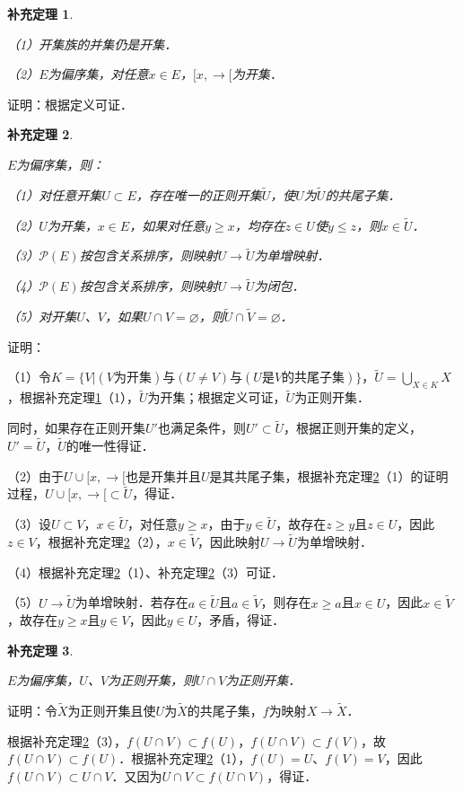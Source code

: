 \documentclass[12pt, a4paper, oneside]{book}
\newtheorem{cor}{补充定理}
\begin{document}
			\begin{cor}\label{cor206}
				\hfill\par
				（1）开集族的并集仍是开集．
				\par
				（2）$E$为偏序集，对任意$x\in E$，$[x, \to [$为开集．
			\end{cor}
			证明：根据定义可证．
			
			\begin{cor}\label{cor207}
				\hfill\par
				$E$为偏序集，则：
				\par
				（1）对任意开集$U\subset E$，存在唯一的正则开集$\tilde{U}$，使$U$为$\tilde{U}$的共尾子集．
				\par
				（2）$U$为开集，$x\in E$，如果对任意$y\geq x$，均存在$z\in U$使$y\leq z$，则$x\in \tilde{U}$．
				\par
				（3）$\mathcal{P}(E)$按包含关系排序，则映射$U\to \tilde{U}$为单增映射．
				\par
				（4）$\mathcal{P}(E)$按包含关系排序，则映射$U\to \tilde{U}$为闭包．
				\par
				（5）对开集$U$、$V$，如果$U\cap V=\varnothing$，则$\tilde{U}\cap \tilde{V}=\varnothing$．
			\end{cor}
			证明：
			\par
			（1）令$K=\{V|(V\text{为开集})\text{与}(U\neq V)\text{与}(U\text{是}V\text{的共尾子集})\}$，$\tilde{U}=\bigcup\limits_{X\in K}X$，根据补充定理\ref{cor206}（1），$\tilde{U}$为开集；根据定义可证，$\tilde{U}$为正则开集．
			\par
			同时，如果存在正则开集$U'$也满足条件，则$U'\subset \tilde{U}$，根据正则开集的定义，$U'=\tilde{U}$，$\tilde{U}$的唯一性得证．
			\par
			（2）由于$U\cup [x, \to [$也是开集并且$U$是其共尾子集，根据补充定理\ref{cor207}（1）的证明过程，$U\cup [x, \to [\subset \tilde{U}$，得证．
			\par
			（3）设$U\subset V$，$x\in \tilde{U}$，对任意$y\geq x$，由于$y\in \tilde{U}$，故存在$z\geq y$且$z\in U$，因此$z\in V$，根据补充定理\ref{cor207}（2），$x\in \tilde{V}$，因此映射$U\to \tilde{U}$为单增映射．
			\par
			（4）根据补充定理\ref{cor207}（1）、补充定理\ref{cor207}（3）可证．
			\par
			（5）$U\to \tilde{U}$为单增映射．若存在$a\in \tilde{U}$且$a\in \tilde{V}$，则存在$x\geq a$且$x\in U$，因此$x\in \tilde{V}$，故存在$y\geq x$且$y\in V$，因此$y\in U$，矛盾，得证．
			
			\begin{cor}\label{cor208}
				\hfill\par
				$E$为偏序集，$U$、$V$为正则开集，则$U\cap V$为正则开集．
			\end{cor}
			证明：令$\tilde{X}$为正则开集且使$U$为$\tilde{X}$的共尾子集，$f$为映射$X\to \tilde{X}$．
			\par
			根据补充定理\ref{cor207}（3），$f(U\cap V)\subset f(U)$，$f(U\cap V)\subset f(V)$，故$f(U\cap V)\subset f(U)$．根据补充定理\ref{cor207}（1），$f(U)=U$、$f(V)=V$，因此$f(U\cap V)\subset U\cap V$．又因为$U\cap V\subset f(U\cap V)$，得证．
			
\end{document}
